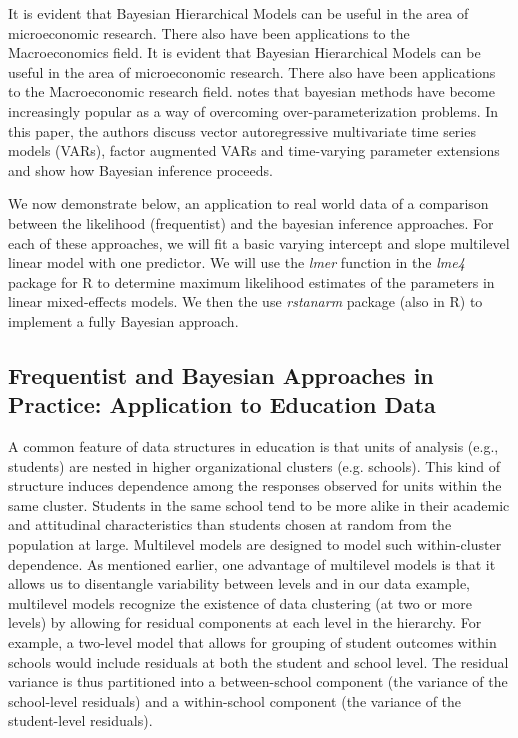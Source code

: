 It is evident that Bayesian Hierarchical Models can be useful in the area of microeconomic research. There also have been applications to the Macroeconomics field. It is evident that Bayesian Hierarchical Models can be useful in the area of microeconomic research. There also have been applications to the Macroeconomic research field. \cite{ koop2010bayesian} notes that bayesian methods have become increasingly popular as a way of overcoming over-parameterization problems. In this paper, the authors discuss vector autoregressive multivariate time
series models (VARs), factor augmented VARs and time-varying parameter extensions and show how Bayesian inference proceeds.

We now demonstrate below, an application to real world data of a comparison between the likelihood (frequentist)  and the bayesian inference approaches. For each of these approaches, we will fit a basic varying intercept and slope multilevel linear model with one predictor. We will use the \textit{lmer} function in the \textit{lme4} package for R to determine maximum likelihood estimates of the parameters in linear mixed-effects models. We then the use \textit{rstanarm} package (also in R) to implement a fully Bayesian approach.




\subsection{Frequentist and Bayesian Approaches in Practice: Application to Education Data}

A common feature of data structures in education is that units of analysis (e.g., students) are nested in higher organizational clusters (e.g. schools). This kind of structure induces dependence among the responses observed for units within the same cluster. Students in the same school tend to be more alike in their academic and attitudinal characteristics than students chosen at random from the population at large. Multilevel models are designed to model such within-cluster dependence. As mentioned earlier, one advantage of multilevel models is that it allows us to disentangle variability between levels and in our data example,  multilevel models recognize the existence of data clustering (at two or more levels) by allowing for residual components at each level in the hierarchy. For example, a two-level model that allows for grouping of student outcomes within schools would include residuals at both the student and school level. The residual variance is thus partitioned into a between-school component (the variance of the school-level residuals) and a within-school component (the variance of the student-level residuals).


